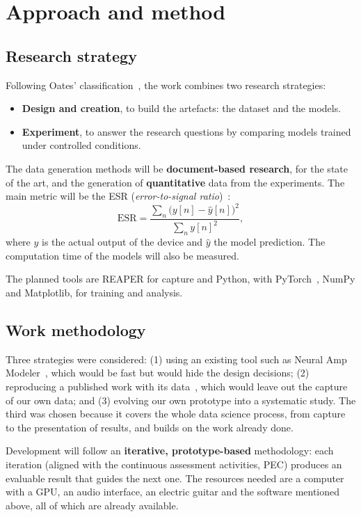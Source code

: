 \documentclass[ENG]{TFUOC}%
\begin{document}
\section{Approach and method}

\subsection{Research strategy}

Following Oates' classification~\cite{oates2006}, the work combines two research strategies:
\begin{itemize}[nosep]
    \item \textbf{Design and creation}, to build the artefacts: the dataset and the models.
    \item \textbf{Experiment}, to answer the research questions by comparing models trained under controlled conditions.
\end{itemize}
The data generation methods will be \textbf{document-based research}, for the state of the art, and the generation of \textbf{quantitative} data from the experiments. The main metric will be the ESR (\emph{error-to-signal ratio})~\cite{wright2019}:
\begin{equation}
\label{eq:esr}
\mathrm{ESR} = \frac{\sum_{n}\big(y[n]-\hat{y}[n]\big)^2}{\sum_{n} y[n]^2},
\end{equation}
where $y$ is the actual output of the device and $\hat{y}$ the model prediction. The computation time of the models will also be measured.

The planned tools are REAPER for capture and Python, with PyTorch~\cite{paszke2019}, NumPy and Matplotlib, for training and analysis.

\subsection{Work methodology}

Three strategies were considered: (1) using an existing tool such as Neural Amp Modeler~\cite{nam}, which would be fast but would hide the design decisions; (2) reproducing a published work with its data~\cite{wright2020}, which would leave out the capture of our own data; and (3) evolving our own prototype into a systematic study. The third was chosen because it covers the whole data science process, from capture to the presentation of results, and builds on the work already done.

Development will follow an \textbf{iterative, prototype-based} methodology: each iteration (aligned with the continuous assessment activities, PEC) produces an evaluable result that guides the next one. The resources needed are a computer with a GPU, an audio interface, an electric guitar and the software mentioned above, all of which are already available.
\end{document}
